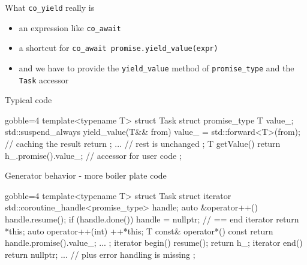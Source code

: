 \begin{frame}[fragile]
  \begin{block}{What \texttt{co\_yield} really is}
    \begin{itemize}
    \item an expression like \texttt{co_await}
    \item a shortcut for \texttt{co_await promise.yield_value(expr)}
    \item and we have to provide the \texttt{yield_value} method of \texttt{promise_type} and the \texttt{Task} accessor
    \end{itemize}
  \end{block}
  \begin{exampleblock}{Typical code}
    {\scriptsize
      \begin{cppcode*}{gobble=4}
        template<typename T> struct Task {
          struct promise_type {
            T value_;
            std::suspend_always yield_value(T&& from) {
              value_ = std::forward<T>(from); // caching the result
              return {};
            }
            ... // rest is unchanged
          };
          T getValue() { return h_.promise().value_; } // accessor for user code
        };
      \end{cppcode*}
    }
  \end{exampleblock}
\end{frame}

\begin{frame}[fragile]
  \begin{block}{Generator behavior - more boiler plate code}
    {\scriptsize
      \begin{cppcode*}{gobble=4}
        template<typename T>
        struct Task {
          struct iterator {
            std::coroutine_handle<promise_type> handle;
            auto &operator++() {
              handle.resume();
              if (handle.done()) { handle = nullptr; } // == end iterator
              return *this;
            }
            auto operator++(int) { ++*this; }
            T const& operator*() const { return handle.promise().value_; }
            ...
          };
          iterator begin() { resume(); return {h_}; }
          iterator end() { return {nullptr}; }
          ... // plus error handling is missing
        };
      \end{cppcode*}
    }
  \end{block}
\end{frame}


